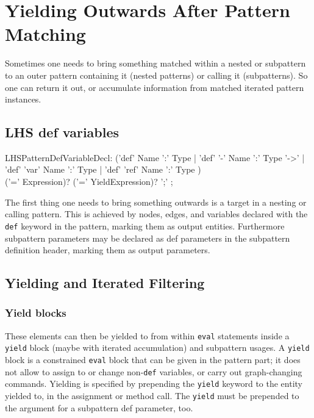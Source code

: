 \section{Yielding Outwards After Pattern Matching} 

Sometimes one needs to bring something matched within a nested or subpattern to an outer pattern containing it (nested patterns) or calling it (subpatterns).
So one can return it out, or accumulate information from matched iterated pattern instances. 

\subsection{LHS def variables} 

\begin{rail} 
  LHSPatternDefVariableDecl: 
	('def' Name ':' Type |
	'def' '-' Name ':' Type '->' |
	'def' 'var' Name ':' Type |
	'def' 'ref' Name ':' Type ) \\
	('=' Expression)? ('=' YieldExpression)? ';'
	;
\end{rail}

The first thing one needs to bring something outwards is a target in a nesting or calling pattern. 
This is achieved by nodes, edges, and variables declared with the \texttt{def} keyword in the pattern, marking them as output entities.
Furthermore subpattern parameters may be declared as def parameters in the subpattern definition header,
marking them as output parameters.

\subsection{Yielding and Iterated Filtering} 

\subsubsection*{Yield blocks} 

These elements can then be yielded to from within \texttt{eval} statements inside a \texttt{yield} block
(maybe with iterated accumulation) and subpattern usages.
A \texttt{yield} block is a constrained \texttt{eval} block that can be given in the pattern part;
it does not allow to assign to or change non-\texttt{def} variables, or carry out graph-changing commands.
Yielding is specified by prepending the \texttt{yield} keyword to the entity yielded to,
in the assignment or method call.
The \texttt{yield} must be prepended to the argument for a subpattern def parameter, too.

